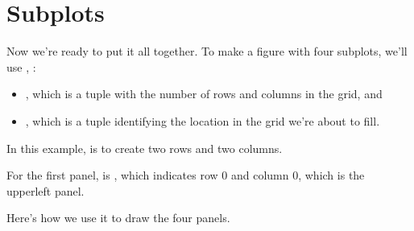 \documentclass[letterpaper,10pt,english]{sphinxmanual}
\begin{document}
\begin{sphinxVerbatim}[commandchars=\\\{\}]

\end{sphinxVerbatim}


\section{Subplots}
\label{\detokenize{07_plot:subplots}}
Now we’re ready to put it all together.  To make a figure with four subplots, we’ll use , :
\begin{itemize}
\item {} 
, which is a tuple with the number of rows and columns in the grid, and

\item {} 
, which is a tuple identifying the location in the grid we’re about to fill.

\end{itemize}

In this example,  is  to create two rows and two columns.

For the first panel,  is , which indicates row 0 and column 0, which is the upper\sphinxhyphen{}left panel.

Here’s how we use it to draw the four panels.
\end{document}
